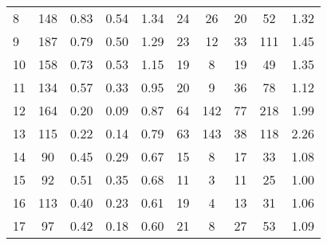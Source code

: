 \begin{tabular}{lccccccccc}
 8 &      148 &                             0.83 &                             0.54 &                             1.34 &              24 &              26 &                                 20 &                              52 &       1.32 \\
 9 &      187 &                             0.79 &                             0.50 &                             1.29 &              23 &              12 &                                 33 &                             111 &       1.45 \\
10 &      158 &                             0.73 &                             0.53 &                             1.15 &              19 &               8 &                                 19 &                              49 &       1.35 \\
11 &      134 &                             0.57 &                             0.33 &                             0.95 &              20 &               9 &                                 36 &                              78 &       1.12 \\
12 &      164 &                             0.20 &                             0.09 &                             0.87 &              64 &             142 &                                 77 &                             218 &       1.99 \\
13 &      115 &                             0.22 &                             0.14 &                             0.79 &              63 &             143 &                                 38 &                             118 &       2.26 \\
14 &       90 &                             0.45 &                             0.29 &                             0.67 &              15 &               8 &                                 17 &                              33 &       1.08 \\
15 &       92 &                             0.51 &                             0.35 &                             0.68 &              11 &               3 &                                 11 &                              25 &       1.00 \\
16 &      113 &                             0.40 &                             0.23 &                             0.61 &              19 &               4 &                                 13 &                              31 &       1.06 \\
17 &       97 &                             0.42 &                             0.18 &                             0.60 &              21 &               8 &                                 27 &                              53 &       1.09 \\

\end{tabular}
